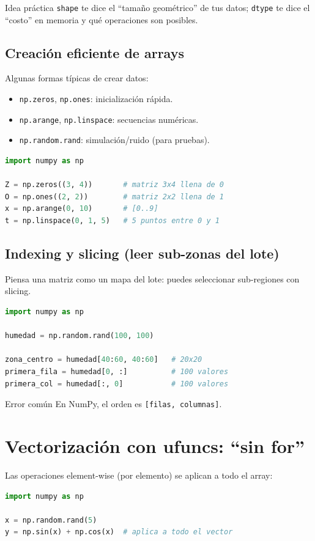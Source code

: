 \documentclass[11pt, a4paper]{article}
\begin{document}
\begin{conceptbox}{Idea práctica}
\texttt{shape} te dice el ``tamaño geométrico'' de tus datos; \texttt{dtype} te dice el ``costo'' en memoria y qué operaciones son posibles.
\end{conceptbox}

\subsection{Creación eficiente de arrays}
Algunas formas típicas de crear datos:
\begin{itemize}
\item \texttt{np.zeros}, \texttt{np.ones}: inicialización rápida.
\item \texttt{np.arange}, \texttt{np.linspace}: secuencias numéricas.
\item \texttt{np.random.rand}: simulación/ruido (para pruebas).
\end{itemize}

\begin{lstlisting}[language=Python, caption={Creación rápida de matrices}]
import numpy as np

Z = np.zeros((3, 4))       # matriz 3x4 llena de 0
O = np.ones((2, 2))        # matriz 2x2 llena de 1
x = np.arange(0, 10)       # [0..9]
t = np.linspace(0, 1, 5)   # 5 puntos entre 0 y 1
\end{lstlisting}

\subsection{Indexing y slicing (leer sub-zonas del lote)}
Piensa una matriz como un mapa del lote: puedes seleccionar sub-regiones con slicing.

\begin{lstlisting}[language=Python, caption={Slicing en 2D: sub-zona del mapa}]
import numpy as np

humedad = np.random.rand(100, 100)

zona_centro = humedad[40:60, 40:60]   # 20x20
primera_fila = humedad[0, :]          # 100 valores
primera_col = humedad[:, 0]           # 100 valores
\end{lstlisting}

\begin{warningbox}{Error común}
En NumPy, el orden es \texttt{[filas, columnas]}.
\end{warningbox}
\newpage
\section{Vectorización con ufuncs: ``sin for''}
Las operaciones element-wise (por elemento) se aplican a todo el array:
\begin{lstlisting}[language=Python, caption={Ufuncs: operaciones vectorizadas}]
import numpy as np

x = np.random.rand(5)
y = np.sin(x) + np.cos(x)  # aplica a todo el vector
\end{lstlisting}
\end{document}
